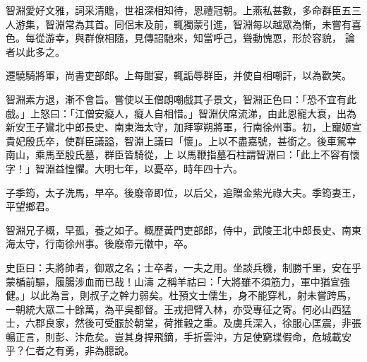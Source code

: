 \begin{pinyinscope}
 智淵愛好文雅，詞采清贍，世祖深相知待，恩禮冠朝。上燕私甚數，多命群臣五三人游集，智淵常為其首。同侶末及前，輒獨蒙引進，智淵每以越眾為慚，未嘗有喜色。每從游幸，與群僚相隨，見傳詔馳來，知當呼己，聳動愧恧，形於容貌，
 論者以此多之。



 遷驍騎將軍，尚書吏部郎。上每酣宴，輒詬辱群臣，并使自相嘲訐，以為歡笑。



 智淵素方退，漸不會旨。嘗使以王僧朗嘲戲其子景文，智淵正色曰：「恐不宜有此戲。」上怒曰：「江僧安癡人，癡人自相惜。」智淵伏席流涕，由此恩寵大衰，出為新安王子鸞北中郎長史、南東海太守，加拜寧朔將軍，行南徐州事。初，上寵姬宣貴妃殷氏卒，使群臣議謚，智淵上議曰「懷」。上以不盡嘉號，甚銜之。後車駕幸南山，乘馬至殷氏墓，群臣皆騎從，上
 以馬鞭指墓石柱謂智淵曰：「此上不容有懷字！」智淵益惶懼。大明七年，以憂卒，時年四十六。



 子季筠，太子洗馬，早卒。後廢帝即位，以后父，追贈金紫光祿大夫。季筠妻王，平望鄉君。



 智淵兄子概，早孤，養之如子。概歷黃門吏部郎，侍中，武陵王北中郎長史、南東海太守，行南徐州事。後廢帝元徽中，卒。



 史臣曰：夫將帥者，御眾之名；士卒者，一夫之用。坐談兵機，制勝千里，安在乎蒙楯前驅，履腸涉血而已哉！山濤
 之稱羊祜曰：「大將雖不須筋力，軍中猶宜強健。」以此為言，則叔子之幹力弱矣。杜預文士儒生，身不能穿札，射未嘗跨馬，一朝統大眾二十餘萬，為平吳都督。王戎把臂入林，亦受專征之寄。何必山西猛士，六郡良家，然後可受脤於朝堂，荷推轂之重。及虜兵深入，徐服心匡震，非張暢正言，則彭、汴危矣。豈其身捍飛鏑，手折雲沖，方足使窮堞假命，危城載安乎？仁者之有勇，非為臆說。



\end{pinyinscope}